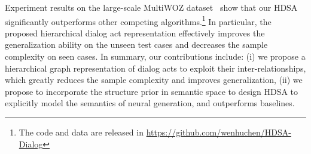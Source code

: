 \documentclass[11pt,a4paper]{article}
\begin{document}
Experiment results on the large-scale MultiWOZ dataset~\cite{DBLP:conf/emnlp/BudzianowskiWTC18} show that our HDSA significantly outperforms other competing algorithms.\footnote{The code and data are released in \url{https://github.com/wenhuchen/HDSA-Dialog}} In particular, the proposed hierarchical dialog act representation effectively improves the generalization ability on the unseen test cases and decreases the sample complexity on seen cases. In summary, our contributions include: (i) we propose a hierarchical graph representation of dialog acts to exploit their inter-relationships, which greatly reduces the sample complexity and improves generalization, (ii) we propose to incorporate the structure prior in semantic space to design HDSA to explicitly model the semantics of neural generation, and outperforms baselines.
\end{document}
